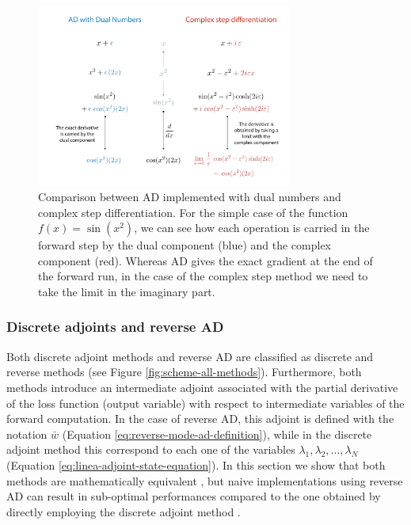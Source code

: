 \begin{figure}[t]
    \centering
    \includegraphics[width=0.75\textwidth]{figures/complex-step-AD.pdf}
    \caption{Comparison between AD implemented with dual numbers and complex step differentiation. For the simple case of the function $f(x) = \sin(x^2)$, we can see how each operation is carried in the forward step by the dual component (blue) and the complex component (red). Whereas AD gives the exact gradient at the end of the forward run, in the case of the complex step method we need to take the limit in the imaginary part. }
    \label{fig:complex-step-AD}
\end{figure}


\subsubsection{Discrete adjoints and reverse AD}
\label{section:comparison-discrete-adjoint-AD}

Both discrete adjoint methods and reverse AD are classified as discrete and reverse methods (see Figure \ref{fig:scheme-all-methods}). 
Furthermore, both methods introduce an intermediate adjoint associated with the partial derivative of the loss function (output variable) with respect to intermediate variables of the forward computation.
In the case of reverse AD, this adjoint is defined with the notation $\bar w$ (Equation \eqref{eq:reverse-mode-ad-definition}), while in the discrete adjoint method this correspond to each one of the variables $\lambda_1, \lambda_2, \ldots, \lambda_N$ (Equation \eqref{eq:linea-adjoint-state-equation}).
In this section we show that both methods are mathematically equivalent \cite{Zhu_Xu_Darve_Beroza_2021, li2020coupled}, but naive implementations using reverse AD can result in sub-optimal performances compared to the one obtained by directly employing the discrete adjoint method \cite{Alexe_Sandu_2009}. 

